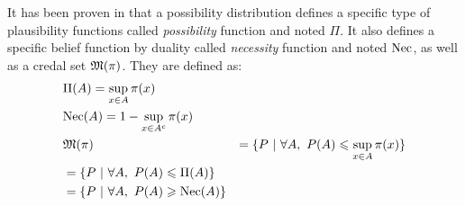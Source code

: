 \begin{definition}
    It has been proven in \cite{dubois_when_1992} that a possibility distribution defines a specific type of plausibility functions called \textit{possibility} function and noted \(\Pi\). It also defines a specific belief function by duality called \textit{necessity} function and noted \(\mathrm{Nec}\), as well as a credal set $\mathfrak{M}(\pi)$. They are defined as:
    \begin{align}
        &\Pi(A) = \sup_{x\in A}\pi(x)\\
        &\mathrm{Nec}(A)=1-\sup_{x\in A^c}\pi(x)\label{eq:bel_pl}\\
        &\mathfrak{M}(\pi) &=\{P~|~\forall A,~P(A)\leqslant \sup_{x\in A}\pi(x)\}\\
        &=\{P~|~\forall A,~P(A)\leqslant \Pi(A)\} \label{eq:credal_set_possibility}\\
        &= \{P~|~\forall A,~P(A)\geqslant \mathrm{Nec}(A)\}
    \end{align}
\end{definition}

